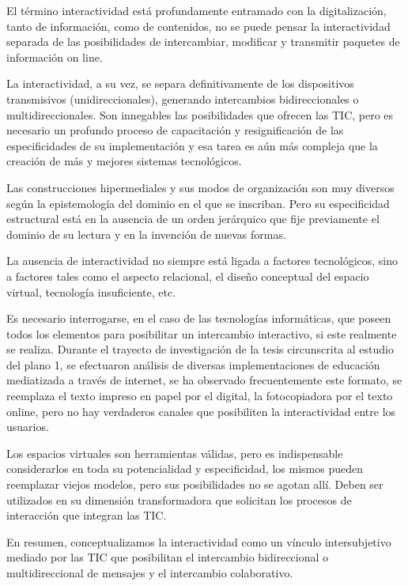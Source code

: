 El término interactividad está profundamente entramado con la
digitalización, tanto de información, como de contenidos, no se puede pensar
la interactividad separada de las posibilidades de intercambiar, modificar y
transmitir paquetes de información on line.

La interactividad, a su vez, se separa definitivamente de los dispositivos
transmisivos (unidireccionales), generando intercambios bidireccionales o
multidireccionales. Son innegables las posibilidades que ofrecen las TIC, pero
es necesario un profundo proceso de capacitación y resignificación de las
especificidades de su implementación y esa tarea es aún más compleja que la
creación de más y mejores sistemas tecnológicos.


Las construcciones hipermediales y sus modos de organización son muy
diversos según la epistemología del dominio en el que se inscriban. Pero su
especificidad estructural está en la ausencia de un orden jerárquico que fije
previamente el dominio de su lectura y en la invención de nuevas formas.


La ausencia de interactividad no siempre está ligada a factores
tecnológicos, sino a factores tales como el aspecto relacional, el diseño
conceptual del espacio virtual, tecnología insuficiente, etc.


Es necesario interrogarse, en el caso de las tecnologías informáticas, que
poseen todos los elementos para posibilitar un intercambio interactivo, si este
realmente se realiza. Durante el trayecto de investigación de la tesis
circunscrita al estudio del plano 1, se efectuaron análisis de diversas
implementaciones de educación mediatizada a través de internet, se ha
observado frecuentemente este formato, se reemplaza el texto
impreso en papel por el digital, la fotocopiadora por el texto online, pero no
hay verdaderos canales que posibiliten la interactividad entre los usuarios.

Los espacios virtuales son herramientas válidas, pero es indispensable
considerarlos en toda su potencialidad y especificidad, los mismos pueden
reemplazar viejos modelos, pero sus posibilidades no se agotan allí. Deben ser
utilizados en su dimensión transformadora que solicitan los procesos de
interacción que integran las TIC.

\begin{defi} [Interactividad] En resumen, conceptualizamos la interactividad
como un vínculo intersubjetivo mediado por las TIC que posibilitan el
intercambio bidireccional o multidireccional de mensajes y el intercambio
colaborativo.
\end{defi} 



